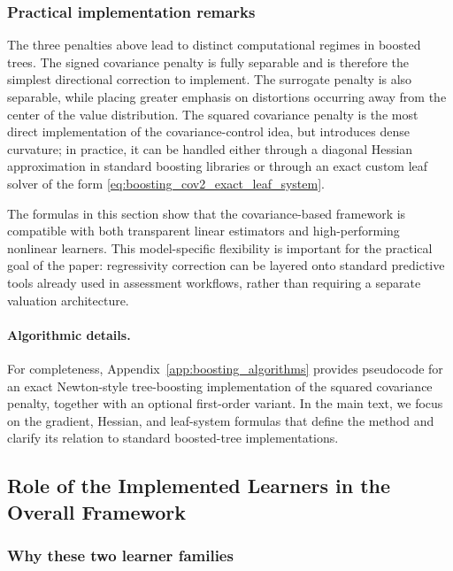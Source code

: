 \documentclass[12pt, draft]{article}
\theoremstyle{plain}
\theoremstyle{definition}
\newcommand{\1}{\mathbf{1}}
\begin{document}
{\subsubsection{Practical implementation remarks}

The three penalties above lead to distinct computational regimes in boosted trees. The signed covariance penalty is fully separable and is therefore the simplest directional correction to implement. The surrogate penalty is also separable, while placing greater emphasis on distortions occurring away from the center of the value distribution. The squared covariance penalty is the most direct implementation of the covariance-control idea, but introduces dense curvature; in practice, it can be handled either through a diagonal Hessian approximation in standard boosting libraries or through an exact custom leaf solver of the form \eqref{eq:boosting_cov2_exact_leaf_system}.

The formulas in this section show that the covariance-based framework is compatible with both transparent linear estimators and high-performing nonlinear learners. This model-specific flexibility is important for the practical goal of the paper: regressivity correction can be layered onto standard predictive tools already used in assessment workflows, rather than requiring a separate valuation architecture.

\paragraph{Algorithmic details.}
For completeness, Appendix~\ref{app:boosting_algorithms} provides pseudocode for an exact Newton-style tree-boosting implementation of the squared covariance penalty, together with an optional first-order variant. In the main text, we focus on the gradient, Hessian, and leaf-system formulas that define the method and clarify its relation to standard boosted-tree implementations.


\subsection{Role of the Implemented Learners in the Overall Framework}


\subsubsection{Why these two learner families}

}
\end{document}
